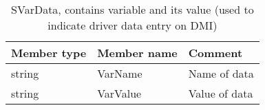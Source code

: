 \documentclass{template/openetcs_article}
\begin{document}
\begin{longtable}{|l|l|l|}
	\caption{SVarData, contains variable and its value (used to indicate driver data entry on DMI)} \\ 
	\hline
		\begin{minipage}[t]{0.20\linewidth} \textbf{Member type}	\end{minipage}
	&	\begin{minipage}[t]{0.20\linewidth} \textbf{Member name}	\end{minipage} 
	&	\begin{minipage}[t]{0.65\linewidth} \textbf{Comment} \end{minipage} \\
	\hline
		\begin{minipage}[t]{0.20\linewidth} string \end{minipage} 
	&	\begin{minipage}[t]{0.20\linewidth} VarName \end{minipage} 
	&	\begin{minipage}[t]{0.65\linewidth} Name of data \end{minipage}\\
	\hline
		\begin{minipage}[t]{0.20\linewidth} string \end{minipage} 
	&	\begin{minipage}[t]{0.20\linewidth} VarValue \end{minipage} 
	&	\begin{minipage}[t]{0.65\linewidth} Value of data \end{minipage}\\
	\hline
\end{longtable}
\end{document}
